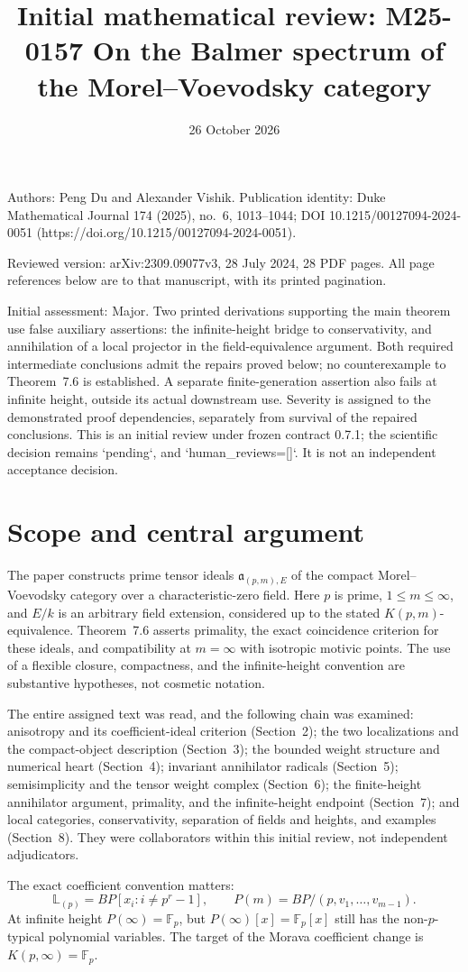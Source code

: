 \documentclass[10pt]{article}
\title{Initial mathematical review: M25-0157
On the Balmer spectrum of the Morel–Voevodsky category}
\author{}
\date{26 October 2026}
\begin{document}
\maketitle
Authors: Peng Du and Alexander Vishik. Publication identity: Duke Mathematical Journal 174 (2025), no. 6, 1013–1044; DOI 10.1215/00127094-2024-0051 (https://doi.org/10.1215/00127094-2024-0051).\par
Reviewed version: arXiv:2309.09077v3, 28 July 2024, 28 PDF pages. All page references below are to that manuscript, with its printed pagination.\par
Initial assessment: Major. Two printed derivations supporting the main theorem use false auxiliary assertions: the infinite-height bridge to conservativity, and annihilation of a local projector in the field-equivalence argument. Both required intermediate conclusions admit the repairs proved below; no counterexample to Theorem 7.6 is established. A separate finite-generation assertion also fails at infinite height, outside its actual downstream use. Severity is assigned to the demonstrated proof dependencies, separately from survival of the repaired conclusions. This is an initial review under frozen contract 0.7.1; the scientific decision remains `pending`, and `human\_reviews=[]`. It is not an independent acceptance decision.\par
\section*{Scope and central argument}
The paper constructs prime tensor ideals \(\mathfrak a_{(p,m),E}\) of the compact Morel–Voevodsky category over a characteristic-zero field. Here \(p\) is prime, \(1\le m\le\infty\), and \(E/k\) is an arbitrary field extension, considered up to the stated \(K(p,m)\)-equivalence. Theorem 7.6 asserts primality, the exact coincidence criterion for these ideals, and compatibility at \(m=\infty\) with isotropic motivic points. The use of a flexible closure, compactness, and the infinite-height convention are substantive hypotheses, not cosmetic notation.\par
The entire assigned text was read, and the following chain was examined: anisotropy and its coefficient-ideal criterion (Section 2); the two localizations and the compact-object description (Section 3); the bounded weight structure and numerical heart (Section 4); invariant annihilator radicals (Section 5); semisimplicity and the tensor weight complex (Section 6); the finite-height annihilator argument, primality, and the infinite-height endpoint (Section 7); and local categories, conservativity, separation of fields and heights, and examples (Section 8). They were collaborators within this initial review, not independent adjudicators.\par
The exact coefficient convention matters: \[\mathbb L_{(p)}=BP[x_i:i\ne p^r-1],\qquad
 P(m)=BP/(p,v_1,\ldots,v_{m-1}).\] At infinite height \(P(\infty)=\mathbb F_p\), but \(P(\infty)[x]=\mathbb F_p[x]\) still has the non-\(p\)-typical polynomial variables. The target of the Morava coefficient change is \(K(p,\infty)=\mathbb F_p\).\par
\end{document}
